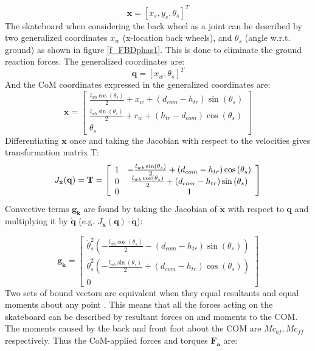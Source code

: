 \begin{equation}
    \mathbf{x} = [x_s, y_s, \theta_s]^T
\end{equation}
The skateboard when considering the back wheel as a joint can be described by two generalized coordinates $x_w$ (x-location back wheels), and $\theta_s$ (angle w.r.t. ground) as shown in figure \ref{f_FBDphas1}. This is done to eliminate the ground reaction forces. The generalized coordinates are:
\begin{equation}
    \mathbf{q} = [x_w, \theta_s]^T
\end{equation}
And the CoM coordinates expressed in the generalized coordinates are:
\begin{equation}
\mathbf{x}=\left[\begin{array}{c}
\frac{l_{w b} \cos \left(\theta_s\right)}{2}+x_w+\left(d_{c o m}-h_{t r}\right) \sin \left(\theta_s\right) \\
\frac{l_{w b} \sin \left(\theta_s\right)}{2}+r_w+\left(h_{t r}-d_{c o m}\right) \cos \left(\theta_s\right) \\
\theta_s
\end{array}\right]
\end{equation}
Differentiating $\mathbf{x}$ once and taking the Jacobian with respect to the velocities gives transformation matrix T:
\begin{equation}
    J_{\dot{\mathbf{x}}}(\mathbf{q}) = \textbf{T} = \left[\begin{array}{c c}
1 & -\frac{l_{w b} \sin \left(\theta_s\right)}{2}+\left(d_{c o m}-h_{t r}\right) \cos \left(\theta_s\right) \\
0 & \frac{l_{w b} \cos \left(\theta_s\right)}{2}+\left(d_{c o m}-h_{t r}\right) \sin \left(\theta_s\right) \\
0 & 1
\end{array}\right]
\end{equation}
Convective terms $\mathbf{g_k}$ are found by taking the Jacobian of $\mathbf{\dot  x}$ with respect to $\mathbf{q}$ and multiplying it by $\mathbf{\dot  q}$ (e.g. $J_{\mathbf{\dot  x}}(\mathbf{q})\cdot \mathbf{\dot  q}$):

\begin{equation}
\mathbf{g_k} = 
\left[\begin{array}{c}
\dot \theta_s^2\left(-\frac{l_{w b} \cos \left(\theta_s\right)}{2}-\left(d_{c o m}-h_{t r}\right) \sin \left(\theta_s\right)\right) \\
\dot \theta_s^2\left(-\frac{l_{w b} \sin \left(\theta_s\right)}{2}+\left(d_{c o m}-h_{t r}\right) \cos \left(\theta_s\right)\right) \\
0
\end{array}\right]
\end{equation}
Two sets of bound vectors are equivalent when they equal resultants and equal moments about any point \cite{moore_force_nodate}. This means that all the forces acting on the skateboard can be described by resultant forces on and moments to the COM. The moments caused by the back and front foot about the COM are $Mc_{bf}, Mc_{ff}$ respectively. Thus the CoM-applied forces and torques $\mathbf{F_{a}}$ are:
 
